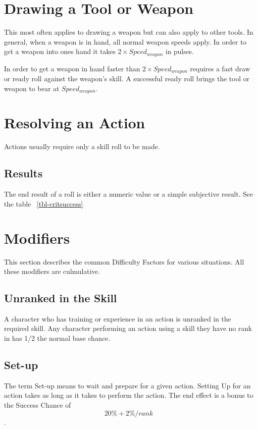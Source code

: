 \section{Drawing a Tool or Weapon}

This most often applies to drawing a weapon but can also apply to 
other tools. In general, when a weapon is in hand, all normal weapon 
speeds apply. In order to get a weapon into ones hand it takes 
\( 2 \times Speed_{weapon} \) in pulses. 

In order to get a weapon in hand faster than \( 2 \times 
Speed_{weapon} \) requires a fast draw or ready roll against the weapon's 
skill. A successful ready roll brings the tool or weapon to bear at 
\( Speed_{weapon} \).  

\section{Resolving an Action}
Actions usually require only a skill roll to be made. 

\subsection{Results}

The end result of a roll is either a numeric value or a simple 
subjective result. See the table ~\ref{tbl-critsuccess}

\section{Modifiers} 

This section describes the common Difficulty Factors for various 
situations. All these modifiers are culmulative.

\subsection{Unranked in the Skill}

A character who has training or experience in an action is
unranked in the required skill. Any character performing an action using 
a skill they have no rank in has 1/2 the normal base chance. 

\subsection{Set-up}

The term Set-up means to wait and prepare for a given action. Setting Up for
an action takes as long as it takes to perform the action. The end effect is a
bonus to the Success Chance of \[ 20\% + 2\%/rank\]. 

